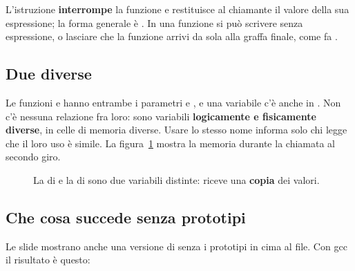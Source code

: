 L'istruzione  \textbf{interrompe} la funzione e restituisce al
chiamante il valore della sua espressione; la forma generale è
. In una funzione  si può scrivere
 senza espressione, o lasciare che la funzione arrivi da sola
alla graffa finale, come fa .

\subsection{Due  diverse}

Le funzioni  e  hanno entrambe i parametri
 e , e una variabile  c'è anche in . Non
c'è nessuna relazione fra loro: sono variabili \textbf{logicamente e
fisicamente diverse}, in celle di memoria diverse. Usare lo stesso nome
informa solo chi legge che il loro uso è simile. La
figura~\ref{fig:due-x} mostra la memoria durante la chiamata
 al secondo giro.

\begin{figure}[H]
  \centering
  \caption{La  di  e la  di  sono
           due variabili distinte:  riceve una
           \textbf{copia} dei valori.}
  \label{fig:due-x}
\end{figure}

\subsection{Che cosa succede senza prototipi}

Le slide mostrano anche una versione di  senza i prototipi in
cima al file. Con gcc il risultato è questo:

